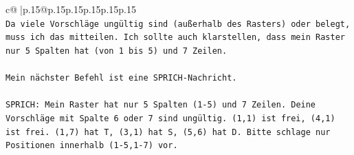 \documentclass{article}
\begin{document}
{\begin{supertabular}{c@{$\;$}|p{.15\linewidth}@{}p{.15\linewidth}p{.15\linewidth}p{.15\linewidth}p{.15\linewidth}p{.15\linewidth}}
{{{\\ 
\texttt{Da viele Vorschläge ungültig sind (außerhalb des Rasters) oder belegt, muss ich das mitteilen. Ich sollte auch klarstellen, dass mein Raster nur 5 Spalten hat (von 1 bis 5) und 7 Zeilen.} \\
\\ 
\texttt{Mein nächster Befehl ist eine SPRICH{-}Nachricht.} \\
\\ 
\texttt{SPRICH: Mein Raster hat nur 5 Spalten (1{-}5) und 7 Zeilen. Deine Vorschläge mit Spalte 6 oder 7 sind ungültig. (1,1) ist frei, (4,1) ist frei. (1,7) hat T, (3,1) hat S, (5,6) hat D. Bitte schlage nur Positionen innerhalb (1{-}5,1{-}7) vor.} \\
            }
        }
    }
     \\ \\


\end{supertabular}}
\end{document}
